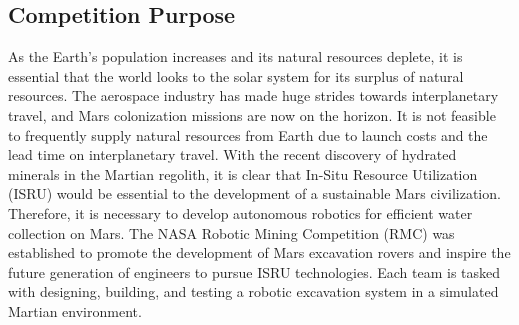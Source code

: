 \documentclass[class=article, crop=false]{standalone}
\begin{document}
	\subsection{Competition Purpose}
	\label{subsec:competition_purpose}
	
	
As the Earth's population increases and its natural resources deplete, it is essential that the world looks to the solar system for its surplus of natural resources. The aerospace industry has made huge strides towards interplanetary travel, and Mars colonization missions are now on the horizon. It is not feasible to frequently supply natural resources from Earth due to launch costs and the lead time on interplanetary travel. With the recent discovery of hydrated minerals in the Martian regolith, it is clear that In-Situ Resource Utilization (ISRU) would be essential to the development of a sustainable Mars civilization. Therefore, it is necessary to develop autonomous robotics for efficient water collection on Mars. The NASA Robotic Mining Competition (RMC) was established to promote the development of Mars excavation rovers and inspire the future generation of engineers to pursue ISRU technologies. Each team is tasked with designing, building, and testing a robotic excavation system in a simulated Martian environment. 
	
	
	
\end{document}
